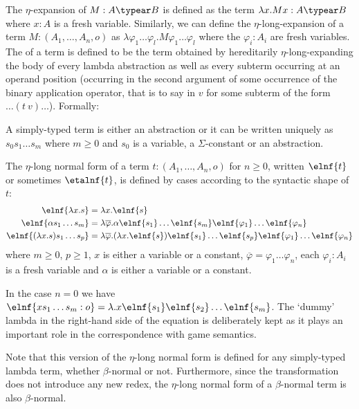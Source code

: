 The $\eta$-expansion of $M: A\typear B$ is defined as the term
$\lambda x . M x : A\typear B$ where $x:A$ is a fresh variable. Similarly, we can define the $\eta$-long-expansion of a term $M : (A_1,\ldots,A_n,o)$ as $\lambda \varphi_1 \ldots \varphi_l . M \varphi_1 \ldots \varphi_l$
where the $\varphi_i:A_i$ are fresh variables.
The  of a term is defined to be the term obtained by hereditarily $\eta$-long-expanding the body of every lambda abstraction as well as every subterm occurring
at an operand position (\ie occurring in the second argument of some
occurrence of the binary application operator, that is to say in $v$
for some subterm of the form $\ldots (t~v) \ldots$).
Formally:
\begin{definition}
A simply-typed term is either an abstraction or it can be written uniquely as
$s_0 s_1 \ldots s_m$ where $m\geq0$ and $s_0$ is a variable, a $\Sigma$-constant or an abstraction.

The $\eta$-long normal form of a term $t:(A_1,\ldots,A_n,o)$ for $n \geq 0$, written $\elnf{t}$ or sometimes $\etalnf{t}$, is defined by cases according to
the syntactic shape of $t$:
\begin{align*}
\elnf{\lambda x . s } &= \lambda x . \elnf{s} \\
\elnf{\alpha s_1 \ldots s_m } &= \lambda \overline{\varphi} . \alpha \elnf{s_1}\ldots \elnf{s_m} \elnf{\varphi_1} \ldots \elnf{\varphi_n}
\\
\elnf{(\lambda x . s) s_1 \ldots s_p } &= \lambda \overline{\varphi} . (\lambda x . \elnf{s}) \elnf{s_1} \ldots \elnf{s_p} \elnf{\varphi_1} \ldots \elnf{\varphi_n}
\end{align*}
where $m\geq0$, $p\geq 1$, $x$ is either a variable or a constant, $\overline{\varphi} = \varphi_1 \ldots \varphi_n$, each $\varphi_i : A_i$ is a fresh variable and $\alpha$ is either a variable or a constant.
\end{definition}

In the case $n=0$ we have
$\elnf{x s_1 \ldots s_m : o} = \lambda . x \elnf{s_1} \elnf{s_2} \ldots \elnf{s_m}$.
The `dummy' lambda in the right-hand side of the equation is deliberately kept as it plays an important role in the correspondence with game semantics.



Note that this version of the $\eta$-long normal form is defined for any simply-typed lambda term, whether $\beta$-normal or not.
Furthermore, since the transformation does not introduce any new redex, the $\eta$-long normal form of a $\beta$-normal
  term is also $\beta$-normal.




